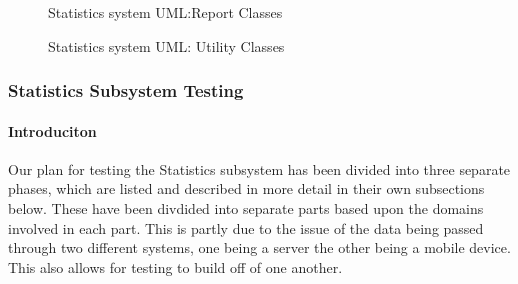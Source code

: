 \documentclass{article}
\begin{document}
\begin{figure}[H]
    \centering
    \begin{center}
    \end{center}
    \caption{Statistics system UML:Report Classes}
    \label{fig:my_label}
\end{figure}
\begin{figure}[H]
    \centering
    \begin{center}
    \end{center}
    \caption{Statistics system UML: Utility Classes}
    \label{fig:my_label}
\end{figure}
\pagebreak

\subsubsection{Statistics Subsystem Testing}

\paragraph{Introduciton}
Our plan for testing the Statistics subsystem has been divided into three separate phases, which are listed and described in more detail in their own subsections below. These have been divdided into separate parts based upon the domains involved in each part. This is partly due to the issue of the data being passed through two different systems, one being a server the other being a mobile device. This also allows for testing to build off of one another.
\end{document}
